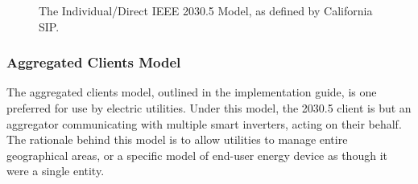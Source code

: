 \begin{figure}[H]
    \begin{center}
        \caption{The Individual/Direct IEEE 2030.5 Model, as defined by California SIP.}
    \end{center}
\end{figure}


\subsubsection{Aggregated Clients Model}
The aggregated clients model, outlined in the implementation guide, is one preferred for use by electric utilities. Under this model, the 2030.5 client is but an aggregator communicating with multiple smart inverters, acting on their behalf.
The rationale behind this model is to allow utilities to manage entire geographical areas, or a specific model of end-user energy device as though it were a single entity.



